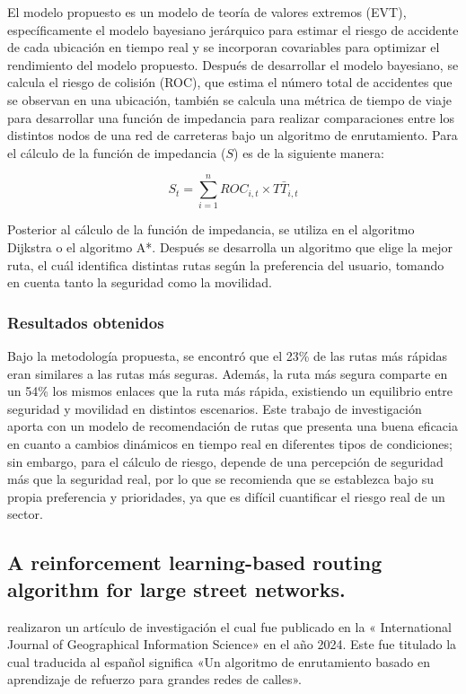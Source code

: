 El modelo propuesto es un modelo de teoría de valores extremos (EVT), específicamente el modelo bayesiano jerárquico para estimar el riesgo de accidente de cada ubicación en tiempo real y se incorporan covariables para optimizar el rendimiento del modelo propuesto. Después de desarrollar el modelo bayesiano, se calcula el riesgo de colisión (ROC), que estima el número total de accidentes que se observan en una ubicación, también se calcula una métrica de tiempo de viaje para desarrollar una función de impedancia para realizar comparaciones entre los distintos nodos de una red de carreteras bajo un algoritmo de enrutamiento. Para el cálculo de la función de impedancia ($S$) es de la siguiente manera:


\begin{equation} 
	S_{t} = \sum_{i=1}^{n}ROC_{i,t}\times T\bar{T}_{i,t}
\end{equation}


Posterior al cálculo de la función de impedancia, se utiliza en el algoritmo Dijkstra o el algoritmo A*. Después se desarrolla un algoritmo que elige la mejor ruta, el cuál identifica distintas rutas según la preferencia del usuario, tomando en cuenta tanto la seguridad como la movilidad.

\subsubsection{Resultados obtenidos}
Bajo la metodología propuesta, se encontró que el 23\% de las rutas más rápidas eran similares a las rutas más seguras. Además, la ruta más segura comparte en un 54\% los mismos enlaces que la ruta más rápida, existiendo un equilibrio entre seguridad y movilidad en distintos escenarios. Este trabajo de investigación aporta con un modelo de recomendación de rutas que presenta una buena eficacia en cuanto a cambios dinámicos en tiempo real en diferentes tipos de condiciones; sin embargo, para el cálculo de riesgo, depende de una percepción de seguridad más que la seguridad real, por lo que se recomienda que se establezca bajo su propia preferencia y prioridades, ya que es difícil cuantificar el riesgo real de un sector.

\subsection{A reinforcement learning-based routing algorithm for large street networks. \citep*{pr_de}}
\citeauthor{pr_de} realizaron un artículo de investigación el cual fue publicado en la « International Journal of Geographical Information Science» en el año 2024. Este fue titulado  la cual traducida al español significa «Un algoritmo de enrutamiento basado en aprendizaje de refuerzo para grandes redes de calles».

